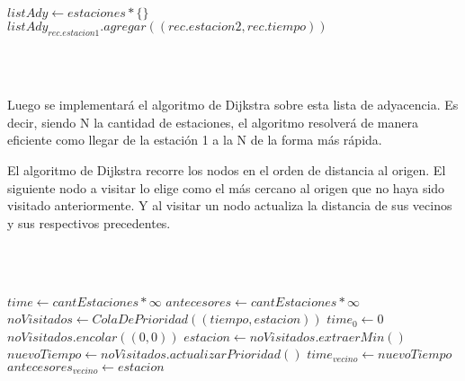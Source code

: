      \\~\\
     
    \begin{algorithmic}
    \State {}
        \State $listAdy \gets estaciones * \{\}$ 
         
            \State $listAdy_{rec.estacion1}.agregar((rec.estacion2, rec.tiempo))$ 
        \EndFor
        \State {}
    \EndFunction
    \end{algorithmic}
     
     \\~\\
    
    \par Luego se implementará el algoritmo de Dijkstra sobre esta lista de adyacencia. Es decir, siendo N la cantidad de estaciones, el algoritmo resolverá de manera eficiente como llegar de la estación 1 a la N de la forma más rápida.
    \par El algoritmo de Dijkstra recorre los nodos en el orden de distancia al origen. El siguiente nodo a visitar lo elige como el más cercano al origen que no haya sido visitado anteriormente. Y al visitar un nodo actualiza la distancia de sus vecinos y sus respectivos precedentes.
    
     \\~\\
    
    \begin{algorithmic}
    \State {}
        \State $time\gets cantEstaciones * \infty$ 
        \State $antecesores\gets cantEstaciones * \infty$ 
        \State $noVisitados\gets ColaDePrioridad((tiempo, estacion))$ 
        \State $time_{0}\gets 0$ 
        \State $noVisitados.encolar((0,0))$ 
         
            \State $estacion\gets noVisitados.extraerMin()$ 
             
                 
                    \State $nuevoTiempo\gets noVisitados.actualizarPrioridad()$ 
                    \State $time_{vecino}\gets nuevoTiempo$ 
                    \State $antecesores_{vecino}\gets estacion$ 
                \EndIf
            \EndFor
        \EndWhile
        \State {} 
    \EndFunction
    \end{algorithmic}
    
